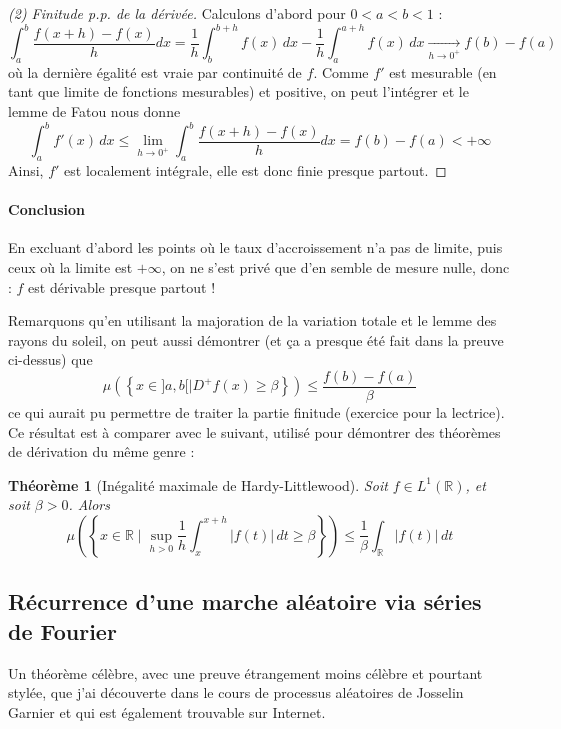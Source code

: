\documentclass[a4paper, 11pt]{article}
\def\R{\mathbb{R}}
\newtheorem*{theorem}{Théorème}
\begin{document}
\begin{proof}[(2) Finitude p.p. de la dérivée]
Calculons d'abord pour $0 < a < b < 1$ :
\[
  \int_a^b \frac{f(x+h) - f(x)}{h}dx =
    \frac{1}{h} \int_b^{b+h} f(x)\,dx - \frac{1}{h} \int_a^{a+h} f(x)\,dx
    \underset{h \to 0^+}{\longrightarrow} f(b) - f(a)
\]
où la dernière égalité est vraie par continuité de $f$. Comme $f'$ est mesurable
(en tant que limite de fonctions mesurables) et positive, on peut l'intégrer et
le lemme de Fatou nous donne
\[ \int_a^b f'(x)\,dx \leq \lim_{h \to 0^+} \int_a^b \frac{f(x+h) - f(x)}{h}dx =
  f(b)- f(a) < +\infty \] 
Ainsi, $f'$ est localement intégrale, elle est donc finie presque partout.
\end{proof}

\paragraph{Conclusion} En excluant d'abord les points où le taux d'accroissement
n'a pas de limite, puis ceux où la limite est $+\infty$, on ne s'est privé que
d'en semble de mesure nulle, donc : $f$ est dérivable presque partout !

Remarquons qu'en utilisant la majoration de la variation totale et le lemme des
rayons du soleil, on peut aussi démontrer (et ça a presque été fait dans la
preuve ci-dessus) que
\[ \mu\left( \left\{ x \in ]a,b[ \mid D^+f(x) \geq \beta \right\} \right)
  \leq \frac{f(b)-f(a)}{\beta} \]
ce qui aurait pu permettre de traiter la partie finitude (exercice pour la
lectrice). Ce résultat est à comparer avec le suivant, utilisé pour démontrer
des théorèmes de dérivation du même genre :
\begin{theorem}[Inégalité maximale de Hardy-Littlewood]
  Soit $f \in L^1(\R)$, et soit $\beta > 0$. Alors
  \[ \mu\left( \left\{ x \in \R \mid \sup_{h > 0} \frac{1}{h} \int_x^{x+h}
        |f(t)|\,dt \geq \beta \right\} \right)
    \leq \frac{1}{\beta} \int_\R |f(t)|\,dt \]
\end{theorem}

\newpage

\subsection{Récurrence d'une marche aléatoire via séries de Fourier}

Un théorème célèbre, avec une preuve étrangement moins célèbre et pourtant
stylée, que j'ai découverte dans le cours de processus aléatoires de Josselin
Garnier et qui est également trouvable sur Internet.
\end{document}
